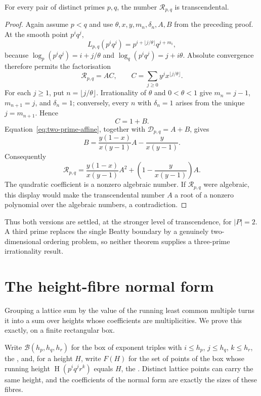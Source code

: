 \documentclass[11pt]{article}
\newcommand{\hgt}{\operatorname{H}}
\begin{document}
\begin{theorem}
\label{res:two-prime-repeated-transcendence}
For every pair of distinct primes $p,q$, the number $\mathcal R_{p,q}$ is
transcendental.
\end{theorem}

\begin{proof}
Again assume $p<q$ and use $\theta,x,y,m_n,\delta_n,A,B$ from the preceding
proof.  At the smooth point $p^iq^j$,
\[
 L_{p,q}(p^iq^j)
 =p^{i+\lfloor j/\theta\rfloor}q^{j+m_i},
\]
because $\log_p(p^iq^j)=i+j/\theta$ and
$\log_q(p^iq^j)=j+i\theta$.
Absolute convergence therefore permits the factorisation
\[
 \mathcal R_{p,q}=A C,
 \qquad
 C=\sum_{j\ge0}y^j x^{\lfloor j/\theta\rfloor}.
\]
For each $j\ge1$, put $n=\lfloor j/\theta\rfloor$.  Irrationality of $\theta$
and $0<\theta<1$ give $m_n=j-1$, $m_{n+1}=j$, and $\delta_n=1$; conversely,
every $n$ with $\delta_n=1$ arises from the unique $j=m_{n+1}$.  Hence
\[
 C=1+B.
\]
Equation~\eqref{eq:two-prime-affine}, together with
$\mathcal D_{p,q}=A+B$, gives
\[
 B=\frac{y(1-x)}{x(y-1)}A-\frac{y}{x(y-1)}.
\]
Consequently
\[
 \mathcal R_{p,q}
 =\frac{y(1-x)}{x(y-1)}A^2
  +\left(1-\frac{y}{x(y-1)}\right)A.
\]
The quadratic coefficient is a nonzero algebraic number.  If
$\mathcal R_{p,q}$ were algebraic, this display would make the transcendental
number $A$ a root of a nonzero polynomial over the algebraic numbers, a
contradiction.
\end{proof}

\noindent
Thus both versions are settled, at the stronger level of transcendence, for
$|P|=2$.  A third prime replaces the single Beatty boundary by a genuinely
two-dimensional ordering problem, so neither theorem supplies a three-prime
irrationality result.

\section{The height-fibre normal form}\label{sec:fibre}

Grouping a lattice sum by the value of the running least common multiple turns
it into a sum over heights whose coefficients are multiplicities.  We prove
this exactly, on a finite rectangular box.

Write $\mathcal B(h_p,h_q,h_r)$ for the box of exponent triples with $i\le h_p$,
$j\le h_q$, $k\le h_r$, the
, and, for a height $H$, write $F(H)$ for the set of points of the box whose
running height $\hgt(p^{i}q^{j}r^{k})$ equals $H$, the
.  Distinct lattice points can carry the same height, and the coefficients
of the normal form are exactly the sizes of these fibres.
\end{document}
